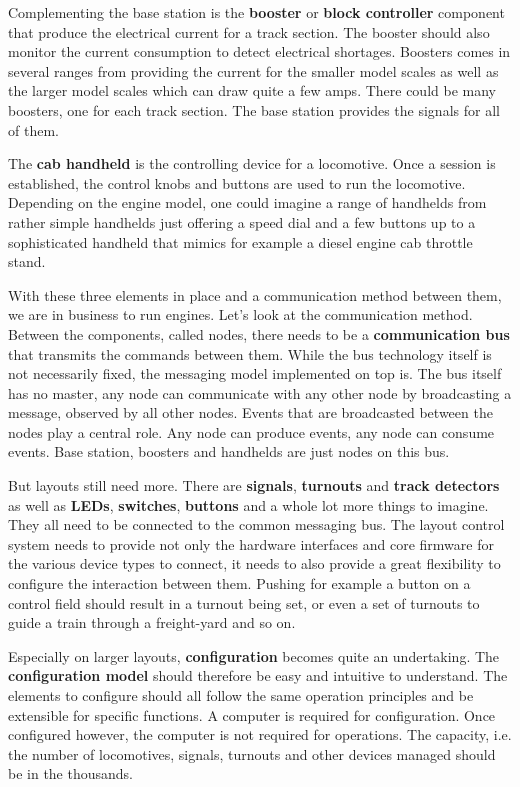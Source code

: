 Complementing the base station is the {\bf booster} or {\bf block controller} component that produce the electrical current for a track section. The booster should also monitor the current consumption to detect electrical shortages. Boosters comes in several ranges from providing the current for the smaller model scales as well as the larger model scales which can draw quite a few amps. There could be many boosters, one for each track section. The base station provides the signals for all of them.

The {\bf cab handheld} is the controlling device for a locomotive. Once a session is established, the control knobs and buttons are used to run the locomotive. Depending on the engine model, one could imagine a range of handhelds from rather simple handhelds just offering a speed dial and a few buttons up to a sophisticated handheld that mimics for example a diesel engine cab throttle stand.

With these three elements in place and a communication method between them, we are in business to run engines. Let's look at the communication method. Between the components, called nodes, there needs to be a {\bf communication bus} that transmits the commands between them. While the bus technology itself is not necessarily fixed, the messaging model implemented on top is. The bus itself has no master, any node can communicate with any other node by broadcasting a message, observed by all other nodes. Events that are broadcasted between the nodes play a central role. Any node can produce events, any node can consume events. Base station, boosters and handhelds are just nodes on this bus.

But layouts still need more. There are {\bf signals}, {\bf turnouts} and {\bf track detectors} as well as {\bf LEDs}, {\bf switches}, {\bf buttons} and a whole lot more things to imagine. They all need to be connected to the common messaging bus. The layout control system needs to provide not only the hardware interfaces and core firmware for the various device types to connect, it needs to also provide a great flexibility to configure the interaction between them. Pushing for example a button on a control field should result in a turnout being set, or even a set of turnouts to guide a train through a freight-yard and so on.

Especially on larger layouts, {\bf configuration} becomes quite an undertaking. The {\bf configuration model} should therefore be easy and intuitive to understand. The elements to configure should all follow the same operation principles and be extensible for specific functions. A computer is required for configuration. Once configured however, the computer is not required for operations. The capacity, i.e. the number of locomotives, signals, turnouts and other devices managed should be in the thousands.

